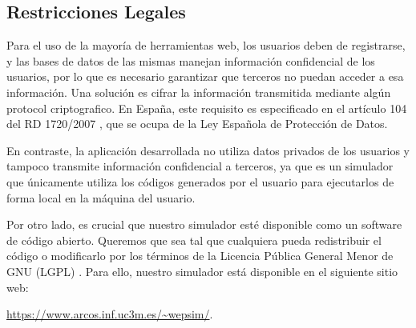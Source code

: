 \subsection{Restricciones Legales}
\label{sec:legal_constraints}

Para el uso de la mayoría de herramientas web, los usuarios deben de registrarse, y las bases de datos de las mismas manejan información confidencial de los usuarios, por lo que es necesario garantizar que terceros no puedan acceder a esa información. Una solución es cifrar la información transmitida mediante algún \gls{protocol} criptografico. En España, este requisito es especificado en el artículo 104 del RD 1720/2007 \cite{boe2008}, que se ocupa de la Ley Española de Protección de Datos.


En contraste, la aplicación desarrollada no utiliza datos privados de los usuarios y tampoco transmite información confidencial a terceros, ya que es un simulador que únicamente utiliza los códigos generados por el usuario para ejecutarlos de forma local en la máquina del usuario.


Por otro lado, es crucial que nuestro simulador esté disponible como un software de código abierto. Queremos que sea tal que cualquiera pueda redistribuir el código o modificarlo por los términos de la Licencia Pública General Menor de GNU (LGPL) \cite{gnulgpl}. Para ello, nuestro simulador está disponible en el siguiente sitio web: 

\url{https://www.arcos.inf.uc3m.es/~wepsim/}.

\afterpage{\blankpage} %